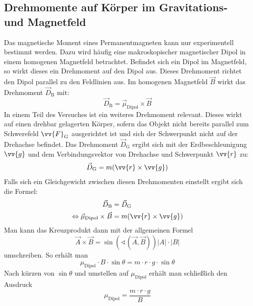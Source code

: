 \subsection{Drehmomente auf Körper im Gravitations- und Magnetfeld}
\label{subsec:Drehmomente}
Das magnetische Moment eines Permanentmagneten kann nur experimentell bestimmt
werden. Dazu wird häufig eine makroskopischer magnetischer Dipol in einem homogenen Magnetfeld betrachtet. Befindet sich ein Dipol im Magnetfeld, so wirkt dieses ein Drehmoment
auf den Dipol aus. Dieses Drehmoment richtet den Dipol parallel zu den Feldlinien aus. Im homogenen Magnetfeld $\vec{B}$ wirkt das Drehmoment $\vec{D}_{\text{B}}$ mit: 
\begin{equation}
    \label{eqn:Drehmoment B-Feld}
    \vec{D}_{\text{B}} = \vec{\mu}_{\text{Dipol}} \times \vec{B}
\end{equation}
In einem Teil des Versuches ist ein weiteres Drehmoment relevant. Dieses wirkt auf einen drehbar gelagerten Körper, sofern das Objekt nicht bereits parallel zum 
Schwerefeld $\vv{F}_{\text{G}}$ ausgerichtet ist und sich der Schwerpunkt nicht auf der Drehachse befindet. Das Drehmoment $\vec{D}_{\text{G}}$ ergibt sich mit der
Erdbeschleunigung $\vv{g}$ und dem Verbindungsvektor von Drehachse und Schwerpunkt $\vv{r}$ zu:
\begin{equation}
    \label{eqn:Drehmoment Schwerefeld}
    \vec{D}_{\text{G}} = m(\vv{r} \times \vv{g})
\end{equation}
Falls sich ein Gleichgewicht zwischen diesen Drehmomenten einstellt ergibt sich die Formel:
    \begin{align*}
    \label{eqn:Drehmoment_Gleichgewicht}
    \vec{D}_{\text{B}} &= \vec{D}_{\text{G}} \\
    \Leftrightarrow \vec{\mu}_{\text{Dipol}} \times \vec{B} &= m(\vv{r} \times \vv{g})
\end{align*}
Man kann das Kreuzprodukt dann mit der allgemeinen Formel 
\begin{equation}
    \label{eqn:Kreuzprodukt}
    \vec{A} \times \vec{B} = \sin(\sphericalangle(\vec{A},\vec{B}))\lvert A \rvert \cdot\lvert B \rvert
\end{equation}
umschreiben. So erhält man
\begin{equation}
    \label{eqn:Drehmoment_Gleichgewicht1}
    \mu_{\text{Dipol}}\cdot B\cdot \sin\theta = m\cdot r\cdot g\cdot\sin\theta
\end{equation}
Nach kürzen von $\sin\theta$ und umstellen auf $\mu_{\text{Dipol}}$ erhält man schließlich den Ausdruck
\begin{equation}
    \label{eqn:Drehmoment_Gleichgewicht2}
    \mu_{\text{Dipol}} = \frac{m \cdot r\cdot g}{B} 
\end{equation}

